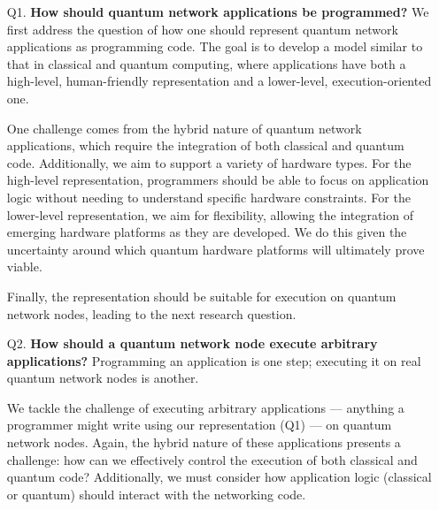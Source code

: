
\begin{itemize}
  \item[Q1.] \textbf{How should quantum network applications be programmed?}
    We first address the question of how one should represent quantum network applications as programming code.
    The goal is to develop a model similar to that in classical and quantum computing, where applications have both a high-level, human-friendly representation and a lower-level, execution-oriented one.

    One challenge comes from the hybrid nature of quantum network applications, which require the integration of both classical and quantum code.
    Additionally, we aim to support a variety of hardware types.
    For the high-level representation, programmers should be able to focus on application logic without needing to understand specific hardware constraints.
    For the lower-level representation, we aim for flexibility, allowing the integration of emerging hardware platforms as they are developed.
    We do this given the uncertainty around which quantum hardware platforms will ultimately prove viable.

    Finally, the representation should be suitable for execution on quantum network nodes, leading to the next research question.

  \item[Q2.] \textbf{How should a quantum network node execute arbitrary applications?}
    Programming an application is one step; executing it on real quantum network nodes is another.

    We tackle the challenge of executing arbitrary applications --- anything a programmer might write using our representation (Q1) --- on quantum network nodes.
    Again, the hybrid nature of these applications presents a challenge: how can we effectively control the execution of both classical and quantum code?
    Additionally, we must consider how application logic (classical or quantum) should interact with the networking code.
    

\end{itemize}
